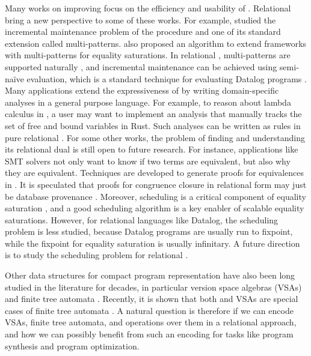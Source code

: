 Many works on improving \egraphs focus on the efficiency and usability of \egraphs.
Relational \egraphs bring a new perspective to some of these works.
For example, \citet{efficient-ematching} studied
 the incremental maintenance problem of the \ematching procedure
 and one of its standard extension called multi-patterns.
\citet{tensat} also proposed an algorithm 
 to extend \egraph frameworks with multi-patterns for equality saturations.
In relational \egraphs, multi-patterns are supported naturally \citep{relational-ematching},
 and incremental maintenance can be achieved using semi-na\"ive evaluation,
 which is a standard technique for evaluating Datalog programs \citep{seminaive}.
Many applications extend the expressiveness of \egraphs 
 by writing domain-specific analyses in a general purpose language.
For example, to reason about lambda calculus in \egg, 
 a user may want to implement an analysis that
 manually tracks the set of free and bound variables \citep{egg}
 in Rust.
Such analyses can be written as rules in pure relational \egraphs.
For some other works, 
 the problem of finding and understanding its relational dual 
 is still open to future research.
For instance,
 applications like SMT solvers not only want to know if two terms are equivalent, 
 but also why they are equivalent.
Techniques are developed to generate proofs for equivalences in \egraphs \citep{proof-producing}.
It is speculated that proofs for congruence closure in relational form 
 may just be database provenance \citep{prov-semiring,prov-souffle}.
Moreover,
 scheduling is a critical component of equality saturation \citep{egg}, 
 and a good scheduling algorithm is a key enabler of scalable equality saturations.
However, 
 for relational languages like Datalog,
 the scheduling problem is less studied,
 because Datalog programs are usually run to fixpoint,
 while the fixpoint for equality saturation is usually infinitary.
A future direction is to study the scheduling problem for relational \egraphs.

Other data structures for compact program representation 
 have also been long studied in the literature for decades,
 in particular version space algebras (VSAs) \citep{vsa,flashmeta} 
 and finite tree automata \citep{blaze, dace}.
Recently, it is shown that both \egraphs and VSAs are special cases of finite tree automata \citep{vsa-eq-fta}.
A natural question is therefore if we can encode 
 VSAs, finite tree automata, and operations over them in a relational approach,
 and how we can possibly benefit from such an encoding for tasks 
 like program synthesis and program optimization.

